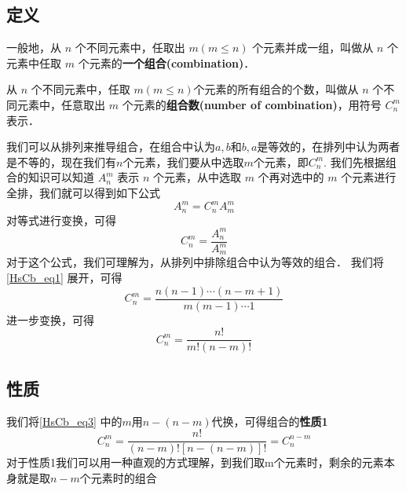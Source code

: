 
\begin{issues}
\issueDraft
\end{issues}


\subsection{定义}
一般地，从 $n$ 个不同元素中，任取出 $m(m\leq n)$ 个元素并成一组，叫做从 $n$ 个元素中任取 $m$ 个元素的\textbf{一个组合(combination)}．

从 $n$ 个不同元素中，任取 $m(m\leq n)$个元素的所有组合的个数，叫做从 $n$ 个不同元素中，任意取出 $m$ 个元素的\textbf{组合数(number of combination)}，用符号 $C_n^m$ 表示．

我们可以从排列来推导组合，在组合中认为${a,b}$和${b,a}$是等效的，在排列中认为两者是不等的，现在我们有$n$个元素，我们要从中选取$m$个元素，即$C_n^m$.
我们先根据组合的知识可以知道 $A_n^m$ 表示 $n$ 个元素，从中选取 $m$ 个再对选中的 $m$ 个元素进行全排，我们就可以得到如下公式
\begin{equation}
A_n^m = C_n^m A_m^m
\end{equation}
对等式进行变换，可得
\begin{equation}\label{HsCb_eq1}
C_n^m = \frac {A_n^m}{A_m^m}
\end{equation}
对于这个公式，我们可理解为，从排列中排除组合中认为等效的组合．
我们将\autoref{HsCb_eq1} 展开，可得
\begin{equation}\label{HsCb_eq2} 
C_n^m = \frac{n(n -1) \cdots(n -m + 1)}{m(m-1)\cdots 1}
\end{equation}
进一步变换，可得
\begin{equation}\label{HsCb_eq3}
C_n^m = \frac{n!}{m!(n-m)!}
\end{equation}

\subsection{性质}

我们将\autoref{HsCb_eq3} 中的$m$用$n-(n-m) $代换，可得组合的\textbf{性质1}
\begin{equation}
C_n^m = \frac{n!}{(n -m)![n-(n-m)]!} = C_n^{n-m}
\end{equation}
对于性质1我们可以用一种直观的方式理解，到我们取m个元素时，剩余的元素本身就是取$n-m$个元素时的组合

